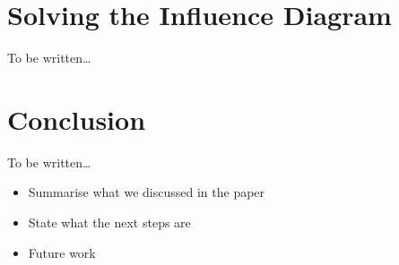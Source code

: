 \documentclass[conference]{IEEEtran}
\begin{document}
% 
% 
% 
% 
% 
% 
% 
% 
% 





\section{Solving the Influence Diagram}

To be written\ldots




\section{Conclusion}

To be written\ldots

\begin{itemize}
\item Summarise what we discussed in the paper
\item State what the next steps are
\item Future work
\end{itemize}

\end{document}
